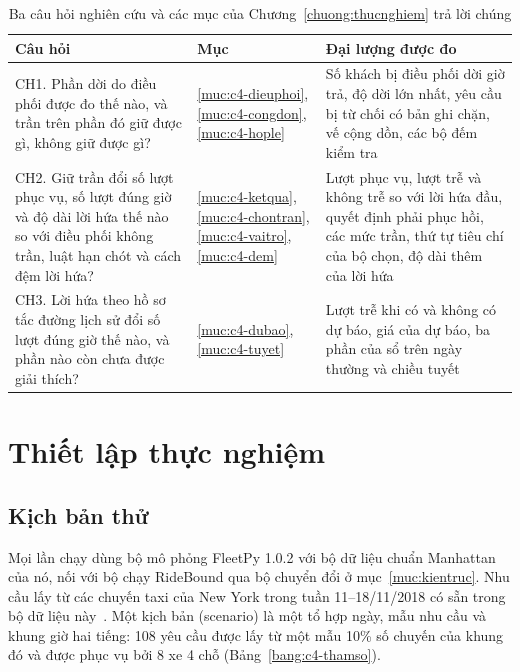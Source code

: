 \begin{table}[htbp]
\centering
\caption{Ba câu hỏi nghiên cứu và các mục của Chương~\ref{chuong:thucnghiem} trả lời chúng}
\label{bang:c4-lotrinh}
\small
\begin{tabular}{@{}p{6.3cm}p{2.4cm}p{6.3cm}@{}}
\toprule
\textbf{Câu hỏi} & \textbf{Mục} & \textbf{Đại lượng được đo}\\
\midrule
CH1. Phần dời do điều phối được đo thế nào, và trần trên phần đó giữ được gì, không giữ được gì?
& \ref{muc:c4-dieuphoi}, \ref{muc:c4-congdon}, \ref{muc:c4-hople}
& Số khách bị điều phối dời giờ trả, độ dời lớn nhất, yêu cầu bị từ chối có bản ghi chặn, vế cộng
dồn, các bộ đếm kiểm tra\\
CH2. Giữ trần đổi số lượt phục vụ, số lượt đúng giờ và độ dài lời hứa thế nào so với điều phối không
trần, luật hạn chót và cách đệm lời hứa?
& \ref{muc:c4-ketqua}, \ref{muc:c4-chontran}, \ref{muc:c4-vaitro}, \ref{muc:c4-dem}
& Lượt phục vụ, lượt trễ và không trễ so với lời hứa đầu, quyết định phải phục hồi, các mức trần, thứ
tự tiêu chí của bộ chọn, độ dài thêm của lời hứa\\
CH3. Lời hứa theo hồ sơ tắc đường lịch sử đổi số lượt đúng giờ thế nào, và phần nào còn chưa được
giải thích?
& \ref{muc:c4-dubao}, \ref{muc:c4-tuyet}
& Lượt trễ khi có và không có dự báo, giá của dự báo, ba phần của sổ trên ngày thường và chiều tuyết\\
\bottomrule
\end{tabular}
\end{table}

\section{Thiết lập thực nghiệm}
\label{muc:c4-thietlap}

\subsection{Kịch bản thử}
\label{muc:c4-kichban}

Mọi lần chạy dùng bộ mô phỏng FleetPy 1.0.2 với bộ dữ liệu chuẩn Manhattan của nó, nối với bộ chạy
RideBound qua bộ chuyển đổi ở mục~\ref{muc:kientruc}. Nhu cầu lấy từ các chuyến taxi của New York trong
tuần 11--18/11/2018 có sẵn trong bộ dữ liệu này~\cite{engelhardt2026}. Một kịch bản (scenario) là một tổ
hợp ngày, mẫu nhu cầu và khung giờ hai tiếng: 108 yêu cầu được lấy từ một mẫu 10\% số chuyến của khung
đó và được phục vụ bởi 8 xe 4 chỗ (Bảng~\ref{bang:c4-thamso}).

